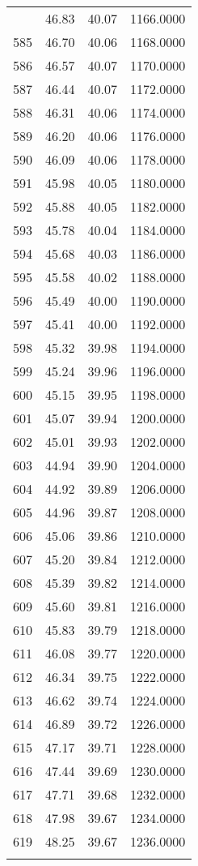 \documentclass[
  captions=tableheading,
]{scrartcl}
\begin{document}
\begin{longtable} {l|l|l|l}
{584	& 46.83 &	40.07 &	1166.0000\\
585	& 46.70 &	40.06 &	1168.0000\\
586	& 46.57 &	40.07 &	1170.0000\\
587	& 46.44 &	40.07 &	1172.0000\\
588	& 46.31 &	40.06 &	1174.0000\\
589	& 46.20 &	40.06 &	1176.0000\\
590	& 46.09 &	40.06 &	1178.0000\\
591	& 45.98 &	40.05 &	1180.0000\\
592	& 45.88 &	40.05 &	1182.0000\\
593	& 45.78 &	40.04 &	1184.0000\\
594	& 45.68 &	40.03 &	1186.0000\\
595	& 45.58 &	40.02 &	1188.0000\\
596	& 45.49 &	40.00 &	1190.0000\\
597	& 45.41 &	40.00 &	1192.0000\\
598	& 45.32 &	39.98 &	1194.0000\\
599	& 45.24 &	39.96 &	1196.0000\\
600	& 45.15	& 39.95	& 1198.0000\\
601	& 45.07	& 39.94	& 1200.0000\\
602	& 45.01	& 39.93	& 1202.0000\\
603	& 44.94	& 39.90	& 1204.0000\\
604	& 44.92	& 39.89	& 1206.0000\\
605	& 44.96	& 39.87	& 1208.0000\\
606	& 45.06	& 39.86	& 1210.0000\\
607	& 45.20	& 39.84	& 1212.0000\\
608	& 45.39	& 39.82	& 1214.0000\\
609	& 45.60	& 39.81	& 1216.0000\\
610	& 45.83	& 39.79	& 1218.0000\\
611	& 46.08	& 39.77	& 1220.0000\\
612	& 46.34	& 39.75	& 1222.0000\\
613	& 46.62	& 39.74	& 1224.0000\\
614	& 46.89	& 39.72	& 1226.0000\\
615	& 47.17	& 39.71	& 1228.0000\\
616	& 47.44	& 39.69	& 1230.0000\\
617	& 47.71	& 39.68	& 1232.0000\\
618	& 47.98	& 39.67	& 1234.0000\\
619	& 48.25	& 39.67	& 1236.0000\\
}
\end{longtable}
\end{document}
